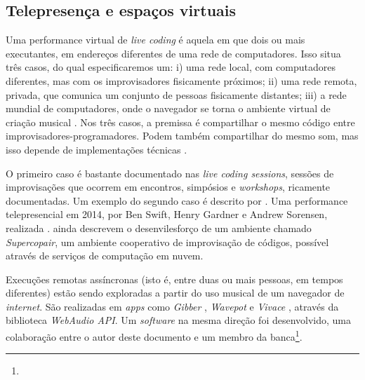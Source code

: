 \subsection{Telepresença e espaços virtuais}\label{sec:telepresenca}

Uma performance virtual de \emph{live coding} é aquela em que dois ou mais executantes, em endereços diferentes de uma rede de computadores. Isso situa três casos, do qual especificaremos um: i) uma rede local, com computadores diferentes, mas com os improvisadores fisicamente próximos; ii) uma rede remota, privada, que comunica um conjunto de pessoas fisicamente distantes; iii) a rede mundial de computadores, onde o navegador se torna o ambiente virtual de criação musical \cite{roberts_web_2013}. Nos três casos, a premissa é compartilhar o mesmo código entre improvisadores-programadores. Podem também compartilhar do mesmo som, mas isso depende de implementações técnicas . 

O primeiro caso é bastante documentado nas \emph{live coding sessions}, sessões de improvisações que ocorrem em encontros, simpósios e \emph{workshops}, ricamente documentadas. Um exemplo do segundo caso é descrito por . Uma performance telepresencial em 2014, por Ben Swift, Henry Gardner e Andrew Sorensen, realizada .  ainda descrevem o desenvilesforço de um ambiente chamado \emph{Supercopair}, um ambiente cooperativo de improvisação de códigos, possível através de serviços de computação em nuvem.    

Execuções remotas assíncronas (isto é, entre duas ou mais pessoas, em tempos diferentes) estão sendo exploradas a partir do uso musical de um navegador de \emph{internet}. São realizadas em \emph{apps} como \emph{Gibber} \cite{roberts_gibber:_2012}, \emph{Wavepot} e \emph{Vivace} \cite{vieira_vivace:_2015}, através da biblioteca \emph{WebAudio API}. Um \emph{software} na mesma direção foi desenvolvido, uma colaboração entre o autor deste documento e um membro da banca\footnote{}.  



